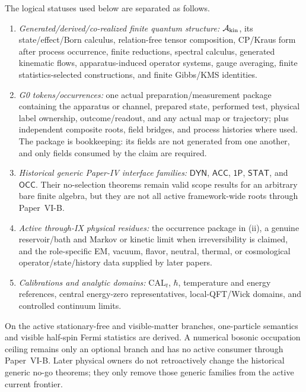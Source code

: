 \documentclass[12pt,a4paper]{article}
\begin{document}
\begin{remark}
\label{p4:rem:selector-status-partition}
The logical statuses used below are separated as follows.
\begin{enumerate}[label=(\roman*)]
\item \emph{Generated/derived/co-realized finite quantum structure:}
\(\mathcal A_{\rm kin}\), its state/effect/Born calculus, relation-free
tensor composition, CP/Kraus form after process occurrence, finite reductions,
spectral calculus, generated kinematic flows, apparatus-induced operator
systems, gauge averaging, finite statistics-selected constructions, and finite
Gibbs/KMS identities.
\item \emph{G0 tokens/occurrences:} one actual preparation/measurement package
containing the apparatus or channel, prepared state, performed test, physical
label ownership, outcome/readout, and any actual map or trajectory; plus
independent composite roots, field bridges, and process histories where used.
The package is bookkeeping: its fields are not generated from one another,
and only fields consumed by the claim are required.
\item \emph{Historical generic Paper-IV interface families:}
\(\mathsf{DYN}\), \(\mathsf{ACC}\), \(\mathsf{1P}\),
\(\mathsf{STAT}\), and \(\mathsf{OCC}\).  Their no-selection theorems remain
valid scope results for an arbitrary bare finite algebra, but they are not all
active framework-wide roots through Paper~VI-B.
\item \emph{Active through-IX physical residues:} the occurrence package in
(ii), a genuine reservoir/bath and Markov or kinetic limit when irreversibility
is claimed, and the role-specific EM, vacuum, flavor, neutral, thermal, or
cosmological operator/state/history data supplied by later papers.
\item \emph{Calibrations and analytic domains:} \(\mathrm{CAL}_t\),
\(\hbar\), temperature and energy references, central energy-zero
representatives, local-QFT/Wick domains, and controlled continuum limits.
\end{enumerate}
On the active stationary-free and visible-matter branches, one-particle
semantics and visible half-spin Fermi statistics are derived.  A numerical
bosonic occupation ceiling remains only an optional branch and has no active
consumer through Paper~VI-B.  Later physical owners do not retroactively change
the historical generic no-go theorems; they only remove those generic families
from the active current frontier.
\end{remark}
\end{document}
